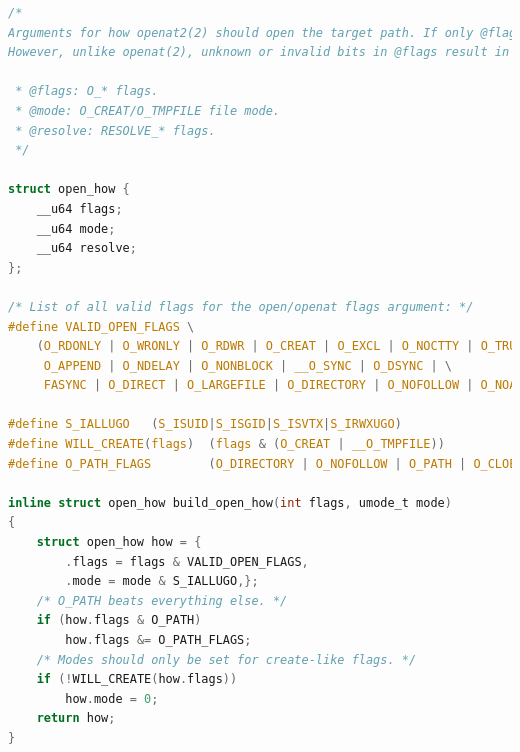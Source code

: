 \documentclass[a4paper,14pt]{extreport}
\begin{document}
\begin{lstlisting}[language=c, caption=Структура open\_how и функция build\_open\_how()]
/*
Arguments for how openat2(2) should open the target path. If only @flags and @mode are non-zero, then openat2(2) operates very similarly to openat(2).
However, unlike openat(2), unknown or invalid bits in @flags result in -EINVAL rather than being silently ignored. @mode must be zero unless one of {O_CREAT, O_TMPFILE} are set.

 * @flags: O_* flags.
 * @mode: O_CREAT/O_TMPFILE file mode.
 * @resolve: RESOLVE_* flags.
 */
 
struct open_how {
	__u64 flags;
	__u64 mode;
	__u64 resolve;
};

/* List of all valid flags for the open/openat flags argument: */
#define VALID_OPEN_FLAGS \
	(O_RDONLY | O_WRONLY | O_RDWR | O_CREAT | O_EXCL | O_NOCTTY | O_TRUNC | \
	 O_APPEND | O_NDELAY | O_NONBLOCK | __O_SYNC | O_DSYNC | \
	 FASYNC	| O_DIRECT | O_LARGEFILE | O_DIRECTORY | O_NOFOLLOW | O_NOATIME | O_CLOEXEC | O_PATH | __O_TMPFILE)
	 
#define S_IALLUGO	(S_ISUID|S_ISGID|S_ISVTX|S_IRWXUGO)
#define WILL_CREATE(flags)	(flags & (O_CREAT | __O_TMPFILE))
#define O_PATH_FLAGS		(O_DIRECTORY | O_NOFOLLOW | O_PATH | O_CLOEXEC)

inline struct open_how build_open_how(int flags, umode_t mode)
{
	struct open_how how = {
		.flags = flags & VALID_OPEN_FLAGS,
		.mode = mode & S_IALLUGO,};
	/* O_PATH beats everything else. */
	if (how.flags & O_PATH)
		how.flags &= O_PATH_FLAGS;
	/* Modes should only be set for create-like flags. */
	if (!WILL_CREATE(how.flags))
		how.mode = 0;
	return how;
}
\end{lstlisting}
\end{document}
